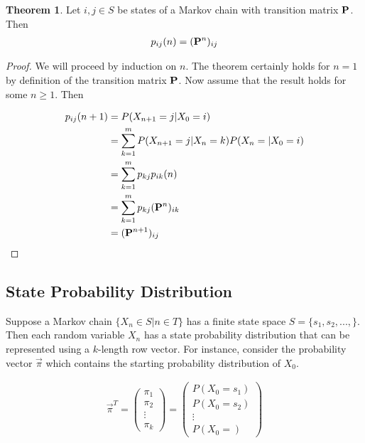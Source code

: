 \documentclass[a4paper,12pt]{article}
\theoremstyle{definition}
\newtheorem{theorem}{Theorem}[subsection]
\let\oldtextbf\mathbf
\renewcommand{\mathbf}[1]{\oldtextbf{\boldmath #1}}
\begin{document}
	\begin{theorem}
		Let $i, j \in S$ be states of a Markov chain with transition matrix $\mathbf{P}$. Then
		\begin{equation*}
		\begin{aligned}
			p_{ij}(n) = (\mathbf{P}^n)_{ij}
		\end{aligned}
		\end{equation*}	
	\end{theorem}
	\begin{proof}
		We will proceed by induction on $n$. The theorem certainly holds for $n=1$ by definition of the transition matrix $\mathbf{P}$.
		Now assume that the result holds for some $n \geq 1$. Then

		\begin{equation*}
		\begin{aligned}
			p_{ij}(n+1) &= P(X_{n+1} = j|X_0 = i) \\
					&= \sum_{k=1}^{m} P(X_{n+1} = j|X_{n} = k)P(X_{n} = | X_0 = i) \\
					&= \sum_{k=1}^{m} p_{kj}p_{ik}(n) \\
					&= \sum_{k=1}^{m} p_{kj}(\mathbf{P}^{n})_{ik} \\
					&= (\mathbf{P}^{n+1})_{ij} 
		\end{aligned}
		\end{equation*}	
	\end{proof}
	
\subsection{State Probability Distribution}

Suppose a Markov chain $\{X_n \in S|n \in T\}$ has a finite state space $S = \{s_1, s_2,...,\}$. Then each random 
variable $X_n$ has a state probability distribution that can be represented using a $k$-length row vector. For instance, 
consider the probability vector $\vec{\pi}$ which contains the starting probability distribution of $X_0$.
	
	\begin{equation*}
	\begin{aligned}
		\vec{\pi}^T = \begin{pmatrix}
		 \pi_1 \\
		 \pi_2 \\ 
		 \vdots \\
		 \pi_k
		 \end{pmatrix} = \begin{pmatrix}
		 P(X_0 = s_1) \\
		 P(X_0 = s_2) \\ 
		 \vdots \\
		 P(X_0 =)
		 \end{pmatrix}
	\end{aligned}
	\end{equation*}		
	
\end{document}
